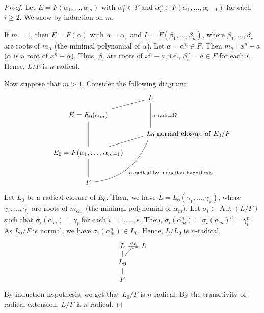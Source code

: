 \documentclass[twoside]{article}
\DeclareMathOperator\Aut{Aut}
\theoremstyle{remark}
\begin{document}
\begin{proof}
  Let \(E = F(\alpha_1, \dots, \alpha_m)\) with \(\alpha_1^n \in F\) and \(\alpha_i^n \in F(\alpha_1, \dots, \alpha_{i-1})\) for each \(i \geq 2\). We show by induction on \(m\).
  
  If \(m = 1\), then \(E = F(\alpha)\) with \(\alpha = \alpha_1\) and \(L = F(\beta_1, \dots, \beta_n)\), where \(\beta_1, \dots, \beta_r\) are roots of \(m_\alpha\) (the minimal polynomial of \(\alpha\)). Let \(a = \alpha^n \in F\). Then \(m_\alpha \mid x^n-a\) (\(\alpha\) is a root of \(x^n-\alpha\)). Thus, \(\beta_i\) are roots of \(x^n-a\), i.e., \(\beta_i^n = a \in F\) for each \(i\). Hence, \(L/F\) is \(n\)-radical.
  
  Now suppose that \(m > 1\). Consider the following diagram:
  \begin{displaymath}
    \begin{tikzcd}[row sep = small]
      & L\ar[dd,dash,"\text{\(n\)-radical?}"] \\
      E = E_0(\alpha_m)\ar[dd,dash]\urar[dash] \\
      & L_0 \rlap{ normal closure of \(E_0/F\)} \\
      E_0 = F(\alpha_1, \dots, \alpha_{m-1}) \ar[dd,dash]\urar[dash] \\
      {} \\
      F\ar[uuur,dash,bend right,"\text{\(n\)-radical by induction hypothesis}"swap]
    \end{tikzcd}
  \end{displaymath}
  Let \(L_0\) be a radical closure of \(E_0\). Then, we have \(L = L_0(\gamma_1, \dots, \gamma_s)\), where \(\gamma_1, \dots, \gamma_s\) are roots of \(m_{\alpha_m}\) (the minimal polynomial of \(\alpha_m\)). Let \(\sigma_i \in \Aut(L/F)\) such that \(\sigma_i(\alpha_m) = \gamma_i\) for each \(i = 1, \dots, s\). Then, \(\sigma_i(\alpha_m^n) = \sigma_i(\alpha_m)^n = \gamma_i^n\). As \(L_0/F\) is normal, we have \(\sigma_i(\alpha_m^n) \in L_0\). Hence, \(L/L_0\) is \(n\)-radical.
  \begin{displaymath}
    \begin{tikzcd}[sep=small]
      L\dar[dash]\rar["\sigma_i"] & L \\
      L_0\dar[dash]\urar[bend left] \\
      F
    \end{tikzcd}
  \end{displaymath}
  By induction hypothesis, we get that \(L_0/F\) is \(n\)-radical. By the transitivity of radical extension, \(L/F\) is \(n\)-radical.
\end{proof}
\end{document}
